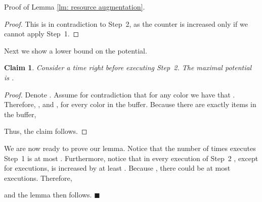 \documentclass[12pt]{article}
\newtheorem{claim}[theorem]{Claim}
\newenvironment{proofof}[1]{ {\sc Proof of #1.}\/}{\qedsymbol}
\renewcommand{\qedsymbol}{\ensuremath{\blacksquare}}
\begin{document}
\begin{proofof}{Lemma \ref{lm: resource augmentation}}
\begin{proof}
This is in contradiction to Step~2, as the counter is increased only if 
we cannot apply Step~1.
\end{proof}

Next we show a lower bound on the potential.
\begin{claim}
Consider a time  right before executing Step~2.
The maximal potential is .
\end{claim}
\begin{proof}
Denote .
Assume for contradiction that for any color  we have that 
. Therefore, , and , 
for every color  in the buffer.
Because there are exactly  items in the buffer, 

Thus, the claim follows.
\end{proof}

We are now ready to prove our lemma.
Notice that the number of times  executes Step~1
is at most . Furthermore, notice that 
in every execution of Step~2 , except for  executions,   is increased 
by at least .
Because , there could be at most 
 executions.
Therefore, 

and the lemma then follows.
\end{proofof}
\end{document}
